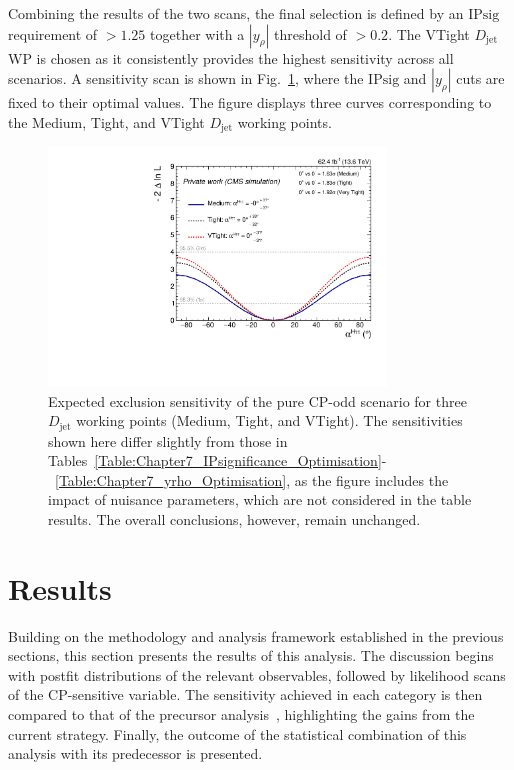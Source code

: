 Combining the results of the two scans, the final selection is defined by an IP$\text{sig}$ requirement of $>1.25$ together with a $|y_\rho|$ threshold of $>0.2$. The VTight $D_{\text{jet}}$ \ac{WP} is chosen as it consistently provides the highest sensitivity across all scenarios. A sensitivity scan is shown in Fig.~\ref{Figure:Chapter7_WP_Optimisation}, where the IP$\text{sig}$ and $|y_\rho|$ cuts are fixed to their optimal values. The figure displays three curves corresponding to the Medium, Tight, and VTight $D_{\text{jet}}$ working points. 

\begin{figure}[!htbp]
    \centering
    \includegraphics[width=0.8\textwidth]{Figures/Chapter7/alpha/alpha_WP.pdf}
    \caption[Expected sensitivity scan for different $D_{\text{jet}}$ working points.]
    {Expected exclusion sensitivity of the pure CP-odd scenario for three $D_{\text{jet}}$ working points (Medium, Tight, and VTight). The sensitivities shown here differ slightly from those in Tables~\ref{Table:Chapter7_IPsignificance_Optimisation}-~\ref{Table:Chapter7_yrho_Optimisation}, as the figure includes the impact of nuisance parameters, which are not considered in the table results. The overall conclusions, however, remain unchanged.}
    \label{Figure:Chapter7_WP_Optimisation}
\end{figure}

\section{Results}

Building on the methodology and analysis framework established in the previous sections, this section presents the results of this analysis. The discussion begins with postfit distributions of the relevant observables, followed by likelihood scans of the CP-sensitive variable. The sensitivity achieved in each category is then compared to that of the precursor analysis~\cite{HiggsCP_CMS_2021}, highlighting the gains from the current strategy. Finally, the outcome of the statistical combination of this analysis with its predecessor is presented.

